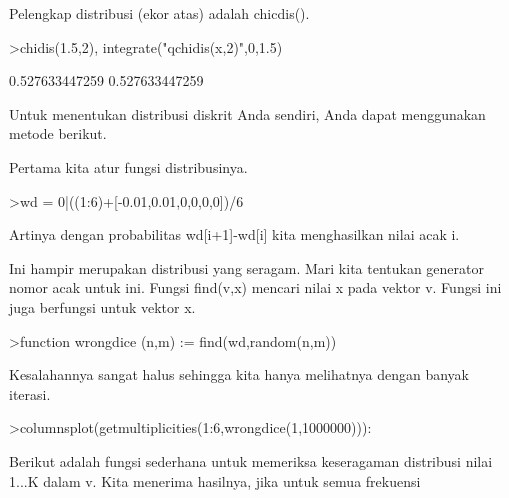\documentclass[a4paper,10pt]{article}
\begin{document}
\begin{eulernotebook}
\begin{eulercomment}
\begin{eulercomment}
\begin{eulercomment}
Pelengkap distribusi (ekor atas) adalah chicdis().
\end{eulercomment}
\begin{eulerprompt}
>chidis(1.5,2), integrate("qchidis(x,2)",0,1.5)
\end{eulerprompt}
\begin{euleroutput}
  0.527633447259
  0.527633447259
\end{euleroutput}
\begin{eulercomment}
Untuk menentukan distribusi diskrit Anda sendiri, Anda dapat
menggunakan metode berikut.

Pertama kita atur fungsi distribusinya.
\end{eulercomment}
\begin{eulerprompt}
>wd = 0|((1:6)+[-0.01,0.01,0,0,0,0])/6
\end{eulerprompt}
\begin{euleroutput}
  [0,  0.165,  0.335,  0.5,  0.666667,  0.833333,  1]
\end{euleroutput}
\begin{eulercomment}
Artinya dengan probabilitas wd[i+1]-wd[i] kita menghasilkan nilai acak
i.

Ini hampir merupakan distribusi yang seragam. Mari kita tentukan
generator nomor acak untuk ini. Fungsi find(v,x) mencari nilai x pada
vektor v. Fungsi ini juga berfungsi untuk vektor x.
\end{eulercomment}
\begin{eulerprompt}
>function wrongdice (n,m) := find(wd,random(n,m))
\end{eulerprompt}
\begin{eulercomment}
Kesalahannya sangat halus sehingga kita hanya melihatnya dengan banyak
iterasi.
\end{eulercomment}
\begin{eulerprompt}
>columnsplot(getmultiplicities(1:6,wrongdice(1,1000000))):
\end{eulerprompt}
\begin{eulercomment}
Berikut adalah fungsi sederhana untuk memeriksa keseragaman distribusi
nilai 1...K dalam v. Kita menerima hasilnya, jika untuk semua
frekuensi


\end{eulercomment}
\end{eulercomment}
\end{eulercomment}
\end{eulernotebook}
\end{document}
